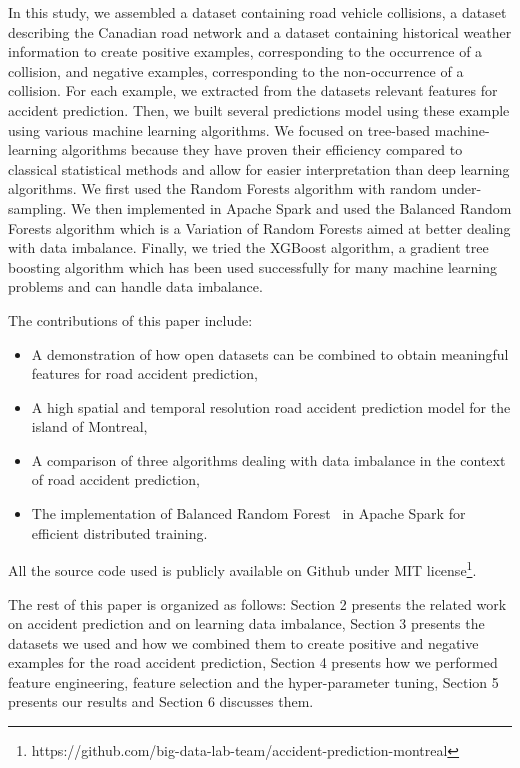 \documentclass[conference]{IEEEtran}
\begin{document}
In this study, we assembled a dataset containing road vehicle collisions, a dataset describing the Canadian road network and a dataset containing historical weather information to create positive examples, corresponding to the occurrence of a collision, and negative examples, corresponding to the non-occurrence of a collision. For each example, we extracted from the datasets relevant features for accident prediction. Then, we built several predictions model using these example using various machine learning algorithms. We focused on tree-based machine-learning algorithms because they have proven their efficiency compared to classical statistical methods \cite{Chang2005, Chang2005b} and allow for easier interpretation than deep learning algorithms. We first used the Random Forests algorithm with random under-sampling. We then implemented in Apache Spark and used the Balanced Random Forests algorithm\cite{Chen2004} which is a Variation of Random Forests aimed at better dealing with data imbalance. Finally, we  tried the XGBoost algorithm, a gradient tree boosting algorithm which has been used successfully for many machine learning problems and can handle data imbalance\cite{xgboost_doc}.

The contributions of this paper include: 
\begin{itemize}
\item A demonstration of how open datasets can be combined to obtain
meaningful features for road accident prediction,
\item A high spatial and temporal resolution road accident prediction model for the island of Montreal,
\item A comparison of three algorithms dealing with data imbalance in the context of road accident prediction,
\item The implementation of Balanced Random Forest~\cite{Chen2004} in Apache Spark for efficient distributed training.
\end{itemize}

All the source code used is publicly available on Github under MIT
license\footnote{https://github.com/big-data-lab-team/accident-prediction-montreal}.

The rest of this paper is organized as follows: Section 2 presents
the related work on accident prediction and on learning data imbalance, Section 3 presents the datasets we used and
how we combined them to create positive and negative examples for the road
accident prediction, Section 4 presents how we performed feature
engineering, feature selection and the hyper-parameter tuning, Section 5
presents our results and Section 6 discusses them.
\end{document}
